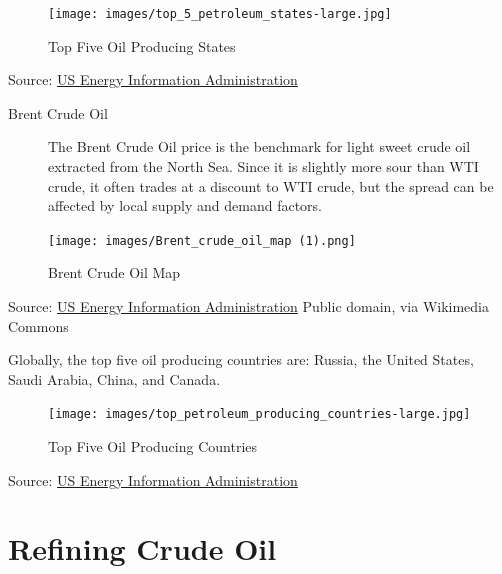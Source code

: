 \documentclass[
  letterpaper,
  DIV=11,
  numbers=noendperiod]{scrreprt}
\begin{document}
\begin{figure}[H]

{\centering \texttt{[image: images/top\_5\_petroleum\_states-large.jpg]}

}

\caption{Top Five Oil Producing States}

\end{figure}%

Source:
\href{http://www.eia.gov/Energyexplained/index.cfm?page=oil_home}{US
Energy Information Administration}

\begin{description}
\item[Brent Crude Oil]
The Brent Crude Oil price is the benchmark for light sweet crude oil
extracted from the North Sea. Since it is slightly more sour than WTI
crude, it often trades at a discount to WTI crude, but the spread can be
affected by local supply and demand factors.
\end{description}

\begin{figure}[H]

{\centering \texttt{[image: images/Brent\_crude\_oil\_map (1).png]}

}

\caption{Brent Crude Oil Map}

\end{figure}%

Source: \href{http://www.eia.gov/countries/cab.cfm?fips=UK}{US Energy
Information Administration} Public domain, via Wikimedia Commons

Globally, the top five oil producing countries are: Russia, the United
States, Saudi Arabia, China, and Canada.

\begin{figure}[H]

{\centering \texttt{[image: images/top\_petroleum\_producing\_countries-large.jpg]}

}

\caption{Top Five Oil Producing Countries}

\end{figure}%

Source:
\href{http://www.eia.gov/Energyexplained/index.cfm?page=oil_home}{US
Energy Information Administration}

\section{Refining Crude Oil}\label{refining-crude-oil}
\end{document}

